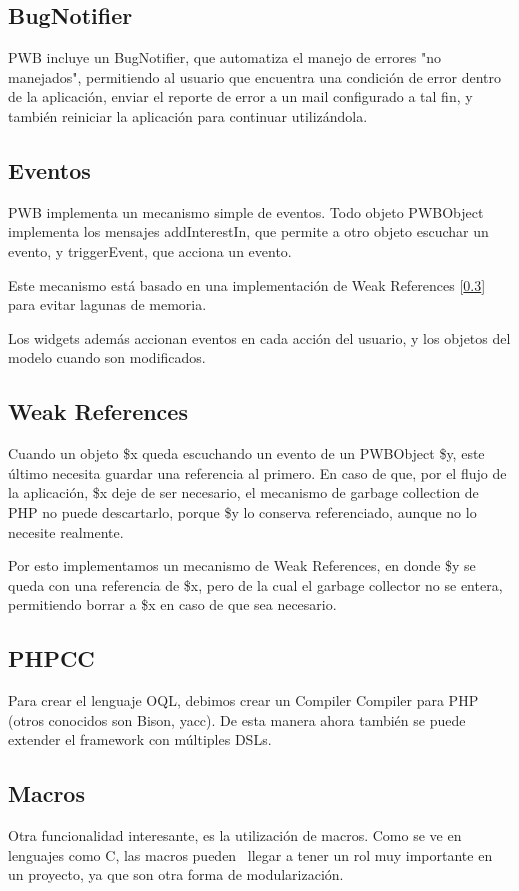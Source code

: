 \subsection{BugNotifier}

PWB incluye un BugNotifier, que automatiza el manejo de errores "no manejados", permitiendo al usuario que
encuentra una condición de error dentro de la aplicación, enviar el reporte de error a un mail configurado a
tal fin, y también reiniciar la aplicación para continuar utilizándola.

\subsection{Eventos}
\label{sub-events}
PWB implementa un mecanismo simple de eventos. Todo objeto PWBObject implementa los mensajes addInterestIn, que permite a otro objeto escuchar un evento, y triggerEvent, que acciona un evento.

Este mecanismo está basado en una implementación de Weak References [\ref{sub-weak}] para evitar lagunas de memoria.

Los widgets además accionan eventos en cada acción del usuario, y los objetos del modelo cuando son modificados.

\subsection{Weak References}
\label{sub-weak}
Cuando un objeto \$x queda escuchando un evento de un PWBObject \$y, este último necesita guardar una referencia al primero. En caso de que, por el flujo de la
aplicación, \$x deje de ser necesario, el mecanismo de garbage collection de PHP no puede descartarlo, porque \$y lo conserva referenciado, aunque no lo
necesite realmente.

Por esto implementamos un mecanismo de Weak References, en donde \$y se queda con una referencia de \$x, pero de la cual el garbage collector no se entera,
permitiendo borrar a \$x en caso de que sea necesario.


\subsection{PHPCC}
\label{sub-phpcc}
Para crear el lenguaje OQL, debimos crear un Compiler Compiler para PHP (otros conocidos son Bison, yacc).
De esta manera ahora también se puede extender el framework con múltiples DSLs.

\subsection{Macros}
\label{sub-macros}
Otra funcionalidad interesante, es la utilización de macros. Como se ve en lenguajes como C, las macros pueden \
llegar a tener un rol muy importante en un proyecto, ya que son otra forma de modularización.

